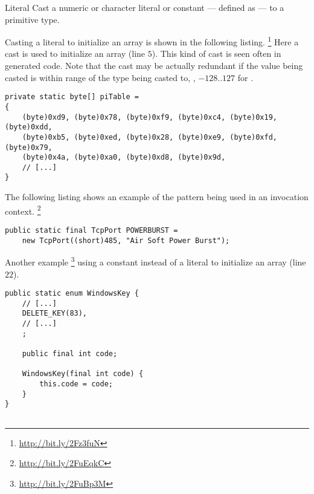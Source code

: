 \begin{pattern}{Literal}
Cast a numeric or character literal or constant --- defined as  ---
to a primitive type.

\instances{}
Casting a literal to initialize an array is shown in the following listing.%
\footnote{\url{http://bit.ly/2Fz3fuN}}
Here a cast is used to initialize an array (line $5$).
This kind of cast is seen often in generated code.
Note that the cast may be actually redundant if the value being casted
is within range of the type being casted to,
\eg{}, $-128..127$ for .

\begin{verbatim}
private static byte[] piTable =
{
    (byte)0xd9, (byte)0x78, (byte)0xf9, (byte)0xc4, (byte)0x19, (byte)0xdd,
    (byte)0xb5, (byte)0xed, (byte)0x28, (byte)0xe9, (byte)0xfd, (byte)0x79,
    (byte)0x4a, (byte)0xa0, (byte)0xd8, (byte)0x9d, 
    // [...]
}
\end{verbatim}

The following listing shows an example of the \thisp{} pattern
being used in an invocation context.%
\footnote{\url{http://bit.ly/2FuEqkC}}

\begin{verbatim}
public static final TcpPort POWERBURST =
    new TcpPort((short)485, "Air Soft Power Burst");
\end{verbatim}

Another example%
\footnote{\url{http://bit.ly/2FuBp3M}}
using a constant instead of a literal to initialize
an array (line $22$).

\begin{verbatim}
public static enum WindowsKey {
    // [...]
    DELETE_KEY(83), 
    // [...]
    ;

    public final int code;

    WindowsKey(final int code) {
        this.code = code;
    }
}


\end{verbatim}
\end{pattern}
